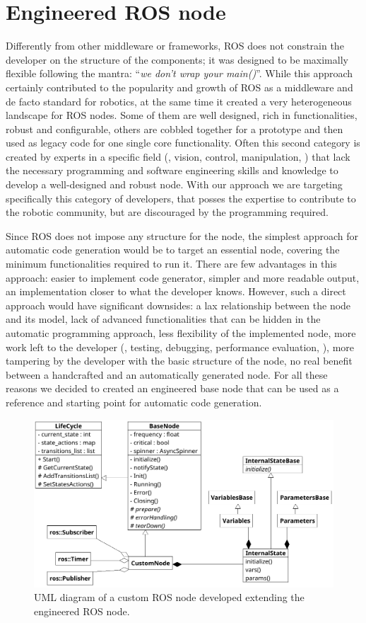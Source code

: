 \section{Engineered ROS node}
\label{sec:ros-node}
Differently from other middleware or frameworks, ROS does not constrain the developer on the structure of the components; it was designed to be maximally flexible following the mantra: ``\textit{we don't wrap your main()}''. While this approach certainly contributed to the popularity and growth of ROS as a middleware and de facto standard for robotics, at the same time it created a very heterogeneous landscape for ROS nodes. Some of them are well designed, rich in functionalities, robust and configurable, others are cobbled together for a prototype and then used as legacy code for one single core functionality. Often this second category is created by experts in a specific field (\eg, vision, control, manipulation, \etc) that lack the necessary programming and software engineering skills and knowledge to develop a well-designed and robust node. With our approach we are targeting specifically this category of developers, that posses the expertise to contribute to the robotic community, but are discouraged by the programming required.

Since ROS does not impose any structure for the node, the simplest approach for automatic code generation would be to target an essential node, covering the minimum functionalities required to run it. There are few advantages in this approach: easier to implement code generator, simpler and more readable output, an implementation closer to what the developer knows. However, such a direct approach would have significant downsides: a lax relationship between the node and its model, lack of advanced functionalities that can be hidden in the automatic programming approach, less flexibility of the implemented node, more work left to the developer (\eg, testing, debugging, performance evaluation, \etc), more tampering by the developer with the basic structure of the node, no real benefit between a handcrafted and an automatically generated node. For all these reasons we decided to created an engineered base node that can be used as a reference and starting point for automatic code generation.

\begin{figure}[t]
    \centering
    \includegraphics[width=\textwidth]{gfx/class}
    \caption{UML diagram of a custom ROS node developed extending the engineered ROS node.}\label{fig:node-class}
\end{figure}

